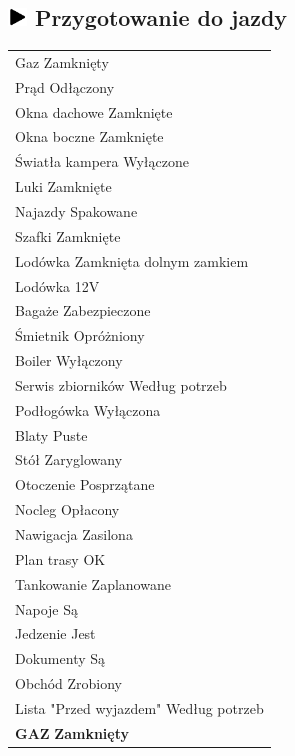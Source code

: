 \documentclass{article}
\begin{document}
\begin{multicols}{2}
\section*{\includegraphics[height=5mm]{start.png} Przygotowanie do jazdy}
\begin{tabularx}{\columnwidth}{|X|}
\hline
Gaz \dotfill Zamknięty \\
Prąd \dotfill Odłączony \\
Okna dachowe \dotfill Zamknięte \\
Okna boczne \dotfill Zamknięte \\
Światła kampera \dotfill Wyłączone \\
Luki \dotfill Zamknięte \\
Najazdy \dotfill Spakowane \\
Szafki \dotfill Zamknięte \\
Lodówka \dotfill Zamknięta dolnym zamkiem \\
Lodówka \dotfill 12V \\
Bagaże \dotfill Zabezpieczone \\
Śmietnik \dotfill Opróżniony \\
Boiler \dotfill Wyłączony \\
Serwis zbiorników \dotfill Według potrzeb \\
Podłogówka \dotfill Wyłączona \\
Blaty \dotfill Puste \\
Stół \dotfill Zaryglowany \\
Otoczenie \dotfill Posprzątane \\
Nocleg \dotfill Opłacony \\
Nawigacja \dotfill Zasilona \\
Plan trasy \dotfill OK \\
Tankowanie \dotfill Zaplanowane \\
Napoje \dotfill Są \\
Jedzenie \dotfill Jest \\
Dokumenty \dotfill Są \\
Obchód \dotfill Zrobiony \\
Lista "Przed wyjazdem" \dotfill Według potrzeb \\
\textbf{GAZ} \dotfill \textbf{Zamknięty} \\
\hline
\end{tabularx}


\end{multicols}
\end{document}
